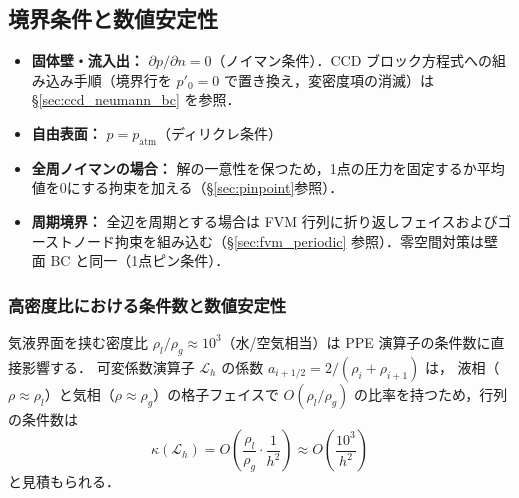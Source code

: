 %
%
\subsection{境界条件と数値安定性}
\label{sec:ppe_bc_stability}
\begin{itemize}
    \item \textbf{固体壁・流入出：} $\partial p/\partial n = 0$（ノイマン条件）．CCD ブロック方程式への組み込み手順（境界行を $p'_0=0$ で置き換え，変密度項の消滅）は §\ref{sec:ccd_neumann_bc} を参照．
    \item \textbf{自由表面：} $p = p_{\mathrm{atm}}$（ディリクレ条件）
    \item \textbf{全周ノイマンの場合：} 解の一意性を保つため，1点の圧力を固定するか平均値を0にする拘束を加える（§\ref{sec:pinpoint}参照）．
    \item \textbf{周期境界：} 全辺を周期とする場合は FVM 行列に折り返しフェイスおよびゴーストノード拘束を組み込む（§\ref{sec:fvm_periodic} 参照）．零空間対策は壁面 BC と同一（1点ピン条件）．
\end{itemize}


\subsubsection{高密度比における条件数と数値安定性}
\label{sec:ppe_condition_number}

気液界面を挟む密度比 $\rho_l/\rho_g \approx 10^3$（水/空気相当）は
PPE 演算子の条件数に直接影響する．
可変係数演算子 $\mathcal{L}_h$ の係数 $a_{i+1/2} = 2/(\rho_i+\rho_{i+1})$ は，
液相（$\rho \approx \rho_l$）と気相（$\rho \approx \rho_g$）の格子フェイスで
$O(\rho_l/\rho_g)$ の比率を持つため，行列の条件数は
\begin{equation}
  \kappa(\mathcal{L}_h) = O\!\left(\frac{\rho_l}{\rho_g}\cdot\frac{1}{h^2}\right)
  \approx O\!\left(\frac{10^3}{h^2}\right)
  \label{eq:ppe_cond_number}
\end{equation}
と見積もられる．

